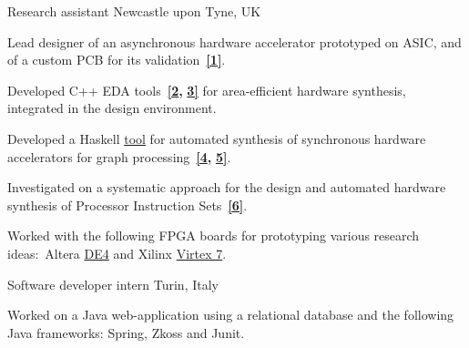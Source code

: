 \begin{cventries}
\cventry
{}
{\vspace{-8mm}Research assistant } %
{\vspace{-8mm}Newcastle upon Tyne, UK} %
{}
{	
\begin{cvitems}
\item {Lead designer of an asynchronous hardware accelerator prototyped on 
ASIC, and of a custom PCB for its 
validation~{\color{myblue}\href{https://github.com/tuura/papers/tree/master/date-2018}{\textbf{[1]}}}.}
\item {Developed C++ EDA
tools~{\color{myblue}\href{https://github.com/tuura/shutters}{\textbf{[2}}}{\color{myblue}\textbf{,}}
{\color{myblue}\href{https://github.com/tuura/scenco}{\textbf{3]}}}
for area-efficient hardware synthesis, integrated in the
\href{https://workcraft.org/}{}
design environment.}
\item {Developed a Haskell 
{\color{myblue}\href{https://github.com/tuura/fantasi/tree/master/doc}{tool}}
for automated synthesis of synchronous hardware accelerators for graph
processing~{\color{myblue}\href{https://youtu.be/Z2w0hiHY3Us}{\textbf{[4}}}{\color{myblue}\textbf{,}}
{\color{myblue}\href{https://poets-project.org/publications}{\textbf{5]}}}.}
\item {Investigated on a systematic approach for the design and automated 
hardware synthesis of Processor Instruction 
Sets~{\color{myblue}\href{https://eprint.ncl.ac.uk/file_store/production/251075/92600BF7-92A0-4B22-897A-01892DDA9E2F.pdf}{\textbf{[6]}}}.}
\item {Worked with the following FPGA boards for prototyping various research 
ideas:~Altera 	
{\color{myblue}\href{https://www.altera.com/solutions/partners/partner-profile/terasic-inc-/board/de4-stratix-iv-development-board.html\#overview}{DE4}}
and Xilinx 	
{\color{myblue}\href{https://www.xilinx.com/products/boards-and-kits/ek-v7-vc707-g.html}{Virtex
 7}}.}
\end{cvitems}
}
\vspace{-4mm}

\cventry
{}%
{\vspace{-8mm}Software developer intern }
{\vspace{-8mm}Turin, Italy}
{}
{
\begin{cvitems}
Worked on a Java web-application using a relational database and 
the following Java frameworks: Spring, Zkoss and Junit.
\end{cvitems}
}


\end{cventries}
\vspace{-2mm}